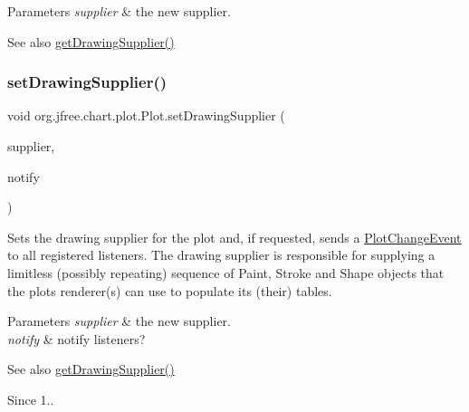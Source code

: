 \begin{DoxyParams}{Parameters}
{\em supplier} & the new supplier.\\
\hline
\end{DoxyParams}
\begin{DoxySeeAlso}{See also}
\mbox{\hyperlink{classorg_1_1jfree_1_1chart_1_1plot_1_1_plot_a371e21293523674a59d87c9d62ffff15}{get\+Drawing\+Supplier()}} 
\end{DoxySeeAlso}
\mbox{\label{classorg_1_1jfree_1_1chart_1_1plot_1_1_plot_ad761c4dfba1f99d610c411531b14f711}} 
\subsubsection{\texorpdfstring{set\+Drawing\+Supplier()}{setDrawingSupplier()}\hspace{0.1cm}{\footnotesize\ttfamily [2/2]}}
{\footnotesize\ttfamily void org.\+jfree.\+chart.\+plot.\+Plot.\+set\+Drawing\+Supplier (\begin{DoxyParamCaption}\item[{\mbox{\hyperlink{interfaceorg_1_1jfree_1_1chart_1_1plot_1_1_drawing_supplier}{Drawing\+Supplier}}}]{supplier,  }\item[{boolean}]{notify }\end{DoxyParamCaption})}

Sets the drawing supplier for the plot and, if requested, sends a \mbox{\hyperlink{}{Plot\+Change\+Event}} to all registered listeners. The drawing supplier is responsible for supplying a limitless (possibly repeating) sequence of {\ttfamily Paint}, {\ttfamily Stroke} and {\ttfamily Shape} objects that the plot\textquotesingle{}s renderer(s) can use to populate its (their) tables.


\begin{DoxyParams}{Parameters}
{\em supplier} & the new supplier. \\
\hline
{\em notify} & notify listeners?\\
\hline
\end{DoxyParams}
\begin{DoxySeeAlso}{See also}
\mbox{\hyperlink{classorg_1_1jfree_1_1chart_1_1plot_1_1_plot_a371e21293523674a59d87c9d62ffff15}{get\+Drawing\+Supplier()}}
\end{DoxySeeAlso}
\begin{DoxySince}{Since}
1.. 
\end{DoxySince}
\mbox{\label{classorg_1_1jfree_1_1chart_1_1plot_1_1_plot_a664fc2bc0ce9e5d2a1e8aa5bc8d01d04}} 
